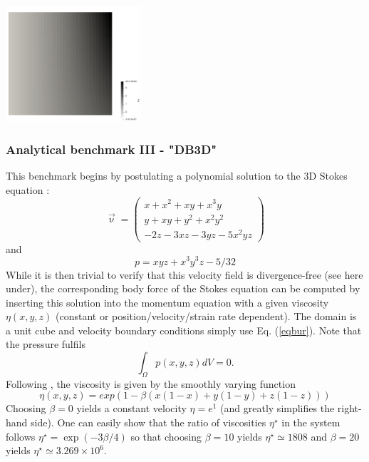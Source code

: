 \begin{center}
\includegraphics[width=5cm]{images/benchmark_db2d/by}
\end{center}

\subsubsection{Analytical benchmark III \label{mms3} - "DB3D"}

This benchmark begins by postulating a polynomial solution 
to the 3D Stokes equation \cite{dobo04}:
\begin{equation}
\vec{\upnu}
=
\left(
\begin{array}{c}
x+x^2+xy+x^3y \\
y + xy + y^2 + x^2 y^2\\
-2z - 3xz - 3yz - 5x^2 yz
\end{array}
\right)
\label{eqbur}
\end{equation}
and
\begin{equation}
p = xyz + x^3 y^3z - 5/32
\end{equation}
While it is then trivial to verify that this velocity field is divergence-free (see here under),  
the corresponding body force of the Stokes equation can be computed by  
inserting this solution into the momentum equation with a given viscosity $\eta(x,y,z)$
(constant or position/velocity/strain rate dependent). 
The domain is a unit cube and velocity boundary conditions 
simply use Eq. (\ref{eqbur}). 
Note that the pressure fulfils 
\[
\int_\Omega p(x,y,z) dV = 0.  
\]
Following \cite{busa13}, the viscosity
is given by the smoothly varying function
\begin{equation}
\eta(x,y,z) = exp(1 - \beta(x(1 - x) + y(1 - y) + z(1 - z)))
\end{equation}
Choosing $\beta=0$ yields a constant velocity $\eta=e^1$ (and greatly simplifies the right-hand side).
One can easily show that the ratio of viscosities $\eta^\star$
in the system follows $\eta^\star=\exp(-3\beta/4)$ so that choosing $\beta=10$ yields
$\eta^\star\simeq 1808$ and $\beta=20$ yields $\eta^\star\simeq 3.269\times10^6$.


